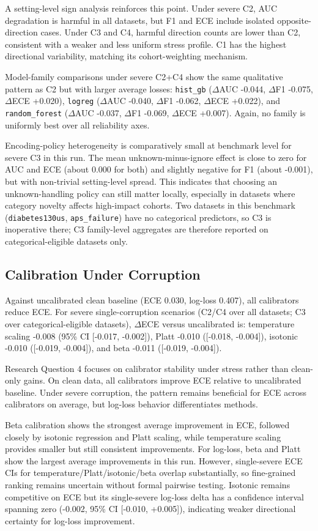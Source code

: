 \documentclass{AuthorGuide/ijitcs}
\begin{document}
A setting-level sign analysis reinforces this point. Under severe C2, AUC degradation is harmful in all datasets, but F1 and ECE include isolated opposite-direction cases. Under C3 and C4, harmful direction counts are lower than C2, consistent with a weaker and less uniform stress profile. C1 has the highest directional variability, matching its cohort-weighting mechanism.

Model-family comparisons under severe C2+C4 show the same qualitative pattern as C2 but with larger average losses: \texttt{hist\_gb} ($\Delta$AUC -0.044, $\Delta$F1 -0.075, $\Delta$ECE +0.020), \texttt{logreg} ($\Delta$AUC -0.040, $\Delta$F1 -0.062, $\Delta$ECE +0.022), and \texttt{random\_forest} ($\Delta$AUC -0.037, $\Delta$F1 -0.069, $\Delta$ECE +0.007). Again, no family is uniformly best over all reliability axes.

Encoding-policy heterogeneity is comparatively small at benchmark level for severe C3 in this run. The mean unknown-minus-ignore effect is close to zero for AUC and ECE (about 0.000 for both) and slightly negative for F1 (about -0.001), but with non-trivial setting-level spread. This indicates that choosing an unknown-handling policy can still matter locally, especially in datasets where category novelty affects high-impact cohorts.
Two datasets in this benchmark (\texttt{diabetes130us}, \texttt{aps\_failure}) have no categorical predictors, so C3 is inoperative there; C3 family-level aggregates are therefore reported on categorical-eligible datasets only.

\subsection{Calibration Under Corruption}
Against uncalibrated clean baseline (ECE 0.030, log-loss 0.407), all calibrators reduce ECE. For severe single-corruption scenarios (C2/C4 over all datasets; C3 over categorical-eligible datasets), $\Delta$ECE versus uncalibrated is: temperature scaling -0.008 (95\% CI [-0.017, -0.002]), Platt -0.010 ([-0.018, -0.004]), isotonic -0.010 ([-0.019, -0.004]), and beta -0.011 ([-0.019, -0.004]).

Research Question 4 focuses on calibrator stability under stress rather than clean-only gains. On clean data, all calibrators improve ECE relative to uncalibrated baseline. Under severe corruption, the pattern remains beneficial for ECE across calibrators on average, but log-loss behavior differentiates methods.

Beta calibration shows the strongest average improvement in ECE, followed closely by isotonic regression and Platt scaling, while temperature scaling provides smaller but still consistent improvements. For log-loss, beta and Platt show the largest average improvements in this run. However, single-severe ECE CIs for temperature/Platt/isotonic/beta overlap substantially, so fine-grained ranking remains uncertain without formal pairwise testing. Isotonic remains competitive on ECE but its single-severe log-loss delta has a confidence interval spanning zero (-0.002, 95\% CI [-0.010, +0.005]), indicating weaker directional certainty for log-loss improvement.
\end{document}
